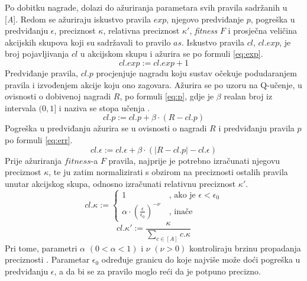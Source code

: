 \documentclass[times, utf8, zavrsni]{fer}
\begin{document}
Po dobitku nagrade, dolazi do ažuriranja parametara svih pravila sadržanih u [\emph{A}].
Redom se ažuriraju iskustvo pravila  $exp$, njegovo predviđanje  $p$, pogreška u predviđanju  $\epsilon$, preciznost  $\kappa$, relativna preciznost  $\kappa'$, \emph{fitness} $F$ i prosječna veličina akcijskih skupova koji su sadržavali to pravilo  $as$.
Iskustvo pravila $cl$, $cl.exp$, je broj pojavljivanja $cl$ u akcijskom skupu i ažurira se po formuli \eqref{eq:exp}.
\begin{equation}
    \label{eq:exp}
    cl.exp := cl.exp + 1
\end{equation}
Predviđanje pravila, $cl.p$ procjenjuje nagradu koju sustav očekuje podudaranjem pravila i izvođenjem akcije koju ono zagovara.
Ažurira se po uzoru na Q-učenje, u ovisnosti o dobivenoj nagradi $R$, po formuli \eqref{eq:p}, gdje je $\beta$ realan broj iz intervala $(0, 1]$ i naziva se stopa učenja .
\begin{equation}
    \label{eq:p}
    cl.p := cl.p + \beta \cdot (R - cl.p)
\end{equation}
Pogreška u predviđanju ažurira se u ovisnosti o nagradi $R$ i predviđanju pravila $p$ po formuli \eqref{eq:err}.
\begin{equation}
    \label{eq:err}
    cl.\epsilon := cl.\epsilon + \beta \cdot (|R - cl.p| - cl.\epsilon)
\end{equation}
Prije ažuriranja $fitness$-a $F$ pravila, najprije je potrebno izračunati njegovu preciznost $\kappa$, te ju zatim normalizirati s obzirom na preciznosti ostalih pravila unutar akcijskog skupa, odnosno izračunati relativnu preciznost $\kappa'$.
\begin{equation}
    \label{eq:acc}
    cl.\kappa :=
    \begin{cases}
        1 &\ \mbox{, ako je } \epsilon < \epsilon_{0} \\
        \alpha \cdot \left( \frac{\epsilon}{\epsilon_{0}} \right)^{-\nu} &\ \mbox{, inače}
    \end{cases}
\end{equation}
\begin{equation}
    \label{eq:racc}
    cl.\kappa' := \frac{\kappa}{\sum_{c \in [A]} c.\kappa}
\end{equation}
Pri tome, parametri $\alpha$ $(0 < \alpha < 1)$ i $\nu$ $(\nu > 0)$ kontroliraju brzinu propadanja preciznosti \citep{5}.
Parametar $\epsilon_{0}$ određuje granicu do koje najviše može doći pogreška u predviđanju $\epsilon$, a da bi se za pravilo moglo reći da je potpuno precizno.
\end{document}
